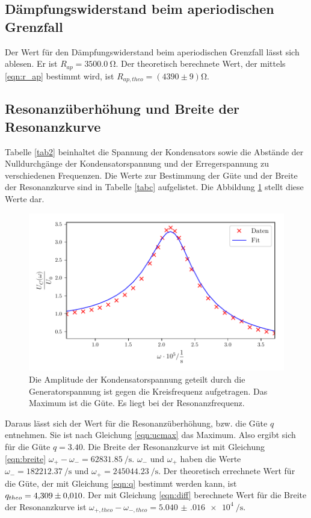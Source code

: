\subsection{Dämpfungswiderstand beim aperiodischen Grenzfall}
Der Wert für den Dämpfungswiderstand beim aperiodischen Grenzfall
lässt sich ablesen. Er ist $R_{ap} = \SI{3500.0}{\ohm}$.
\newline
Der theoretisch berechnete Wert, der mittels \eqref{eqn:r_ap}
bestimmt wird, ist $R_{ap,theo} = (4390 \pm 9) \si{\ohm}$.

\subsection{Resonanzüberhöhung und Breite der Resonanzkurve}
Tabelle \ref{tab2} beinhaltet die Spannung der Kondensators
sowie die Abstände der Nulldurchgänge der Kondensatorspannung
und der Erregerspannung zu verschiedenen Frequenzen.
Die Werte zur Bestimmung der Güte und der Breite der Resonanzkurve
sind in Tabelle \ref{tabc} aufgelistet.
Die Abbildung \ref{fig:plotc} stellt diese Werte dar.


\begin{figure}
  \centering
  \includegraphics{build/plotc.pdf}
  \caption{Die Amplitude der Kondensatorspannung geteilt durch die Generatorspannung
  ist gegen die Kreisfrequenz aufgetragen. Das Maximum ist die Güte. Es liegt bei der
  Resonanzfrequenz.}
  \label{fig:plotc}
\end{figure}
\noindent Daraus lässt sich der Wert für die Resonanzüberhöhung, bzw. die Güte $q$ entnehmen.
Sie ist nach Gleichung \eqref{eqn:ucmax} das Maximum.
Also ergibt sich für die Güte $q = \num{3.40}$.
Die Breite der Resonanzkurve ist mit Gleichung \eqref{eqn:breite}
$\omega_{+} - \omega_{-} = \SI[per-mode=fraction]{62831.85}{\per\second}$.
$\omega_{-}$ und $\omega_{+}$ haben die Werte
$\omega_{-} = \SI[per-mode=fraction]{182212.37}{\per\second}$ und
$\omega_{+} = \SI[per-mode=fraction]{245044.23}{\per\second}$.
\newline
Der theoretisch errechnete Wert für die Güte, der mit Gleichung
\eqref{eqn:q} bestimmt werden kann, ist $q_{theo} = \num{4.309 \pm.010}$.
Der mit Gleichung \eqref{eqn:diff} berechnete Wert für die Breite der
Resonanzkurve ist
$\omega_{+,theo} - \omega_{-,theo} = \SI[per-mode=fraction]{5.040(016)e4}{\per\second}$.
